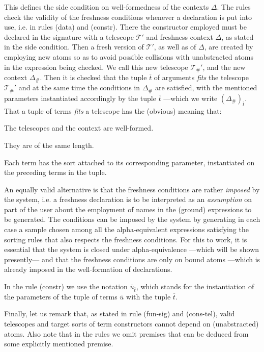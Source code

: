 \documentclass[11pt,a4paper]{amsart}
\newcounter{s}
\newcommand{\vect}[1]{\ensuremath{\overline{#1}}}
\begin{document}
This defines the side condition on well-formedness of the contexts $\Delta$.
The rules check the validity of the freshness conditions whenever a declaration is put into use, i.e. in rules (data) and (constr). There the constructor employed must be declared in the signature with a telescope $\mathscr{T'}$ and freshness context $\Delta$, as stated in the side condition. Then a fresh version of $\mathscr{T'}$, as well as of $\Delta$, are created by employing new atoms so as to avoid possible collisions with unabstracted atoms in the expression being checked. We call this new telescope $\mathscr{T}_{\#}'$, and the new context $\Delta_{\#}$. Then it is checked that the tuple $\vect{t}$ of arguments \emph{fits} the telescope $\mathscr{T}_{\#}'$ and at the same time the conditions in $\Delta_{\#}$ are satisfied, with the mentioned parameters instantiated accordingly by the tuple $\vect{t}$ ---which we write $(\Delta_{\#})_{\vect{t}}$. 
That a tuple of terms \emph{fits} a telescope has the (obvious) meaning that:
\begin{inparaenum}[a)]
\item The telescopes and the context are well-formed.
\item They are of the same length.
\item Each term has the sort attached to its corresponding parameter, instantiated on the preceding terms in the tuple.
\end{inparaenum}

An equally valid alternative is that the freshness conditions are rather \emph{imposed} by the system, i.e. a freshness declaration is to be interpreted as an \emph{assumption} on part of the user about the employment of names in the (ground) expressions to be generated. The conditions can be imposed by the system by generating in each case a sample chosen among all the alpha-equivalent expressions satisfying the sorting rules that also respects the freshness conditions. For this to work, it is essential that the system is closed under alpha-equivalence ---which  will be shown presently--- and that the freshness conditions are only on bound atoms ---which is already imposed in the well-formation of declarations.

In the rule (constr) we use the notation $\vect{u}_{\vect{t}}$, which stands for the instantiation of the parameters of the tuple of terms $\vect{u}$ with the tuple $\vect{t}$.

Finally, let us remark that, as stated in rule (fun-sig) and (cons-tel), valid telescopes and target sorts of term constructors cannot depend on (unabstracted) atoms. Also note that in the rules we omit premises that can be deduced from some explicitly mentioned premise.
\end{document}
